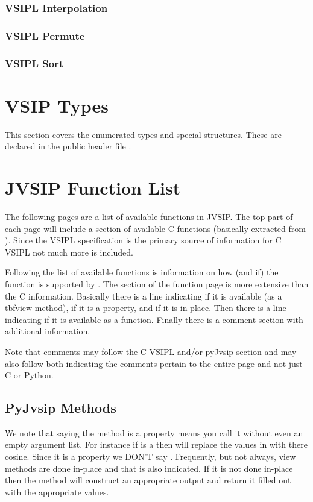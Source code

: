 \subsubsection*{VSIPL Interpolation}
\subsubsection*{VSIPL Permute}
\subsubsection*{VSIPL Sort}
\section*{VSIP Types}
This section covers the enumerated types and special structures. These are declared in the public header file . 
\section*{JVSIP Function List}
The following pages are a list of available functions in JVSIP. The top part of each page will include a section of available C functions (basically extracted from ). Since the VSIPL specification is the primary source of information for C VSIPL not much more is included. 

Following the list of available functions is information on how (and if) the function is supported by \pyjv. The \pyjv section of the function page is more extensive than the C information. Basically there is a line indicating if it is available (as a 	tbf{view} method), if it is a property, and if it is in-place. Then there is a line indicating if it is available as a \pyjv function. Finally there is a comment section with additional information.

Note that comments may follow the C VSIPL and/or pyJvsip section and may also follow both indicating the comments pertain to the entire page and not just C or Python.

\subsection*{PyJvsip Methods}
We note that saying the method is a property means you call it without even an empty argument list. For instance if  is a \pyjv {} then  will replace the values in  with there cosine. Since it is a property we DON'T say . Frequently, but not always, view methods are done in-place and that is also indicated. If it is not done in-place then the method will construct an appropriate output  and return it filled out with the appropriate values.

